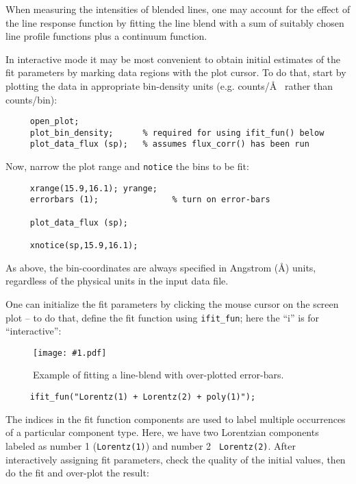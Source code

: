 \documentclass{book}
\newcommand{\putfig}[1]{\texttt{[image: \#1.pdf]}}
\newcommand{\putfig}[1]{\psfig{file=#1.ps}}
\begin{document}
{\begin{enumerate}
When measuring the intensities of blended lines, one may account for the
effect of the line response function by fitting the line blend with a sum of
suitably chosen line profile functions plus a continuum function.

In interactive mode it may be most convenient to obtain initial estimates of
the fit parameters by marking data regions with the plot cursor. To do that,
start by plotting the data in appropriate bin-density units (e.g. counts/\AA~
rather than counts/bin):

     \begin{verbatim}
     open_plot;
     plot_bin_density;      % required for using ifit_fun() below
     plot_data_flux (sp);   % assumes flux_corr() has been run
     \end{verbatim}

Now, narrow the plot range and {\tt notice} the
bins to be fit:

     \begin{verbatim}
     xrange(15.9,16.1); yrange;
     errorbars (1);               % turn on error-bars

     plot_data_flux (sp);

     xnotice(sp,15.9,16.1);
     \end{verbatim}

As above, the bin-coordinates are always specified in Angstrom (\AA)
units, regardless of the physical units in the input data file.

One can initialize the fit parameters by clicking the mouse cursor on the
screen plot -- to do that, define the fit function using {\tt ifit\_fun};
here the ``i'' is for ``interactive'':

\begin{figure}[ht]
\putfig{figures/profile_fit}
\caption{Example of fitting a line-blend with over-plotted error-bars.}
\label{fig:profile_fit}
\end{figure}

\begin{verbatim}
     ifit_fun("Lorentz(1) + Lorentz(2) + poly(1)");
     \end{verbatim}

The indices in the fit function components are used to label multiple
occurrences of a particular component type.  Here, we have two Lorentzian
components labeled as number 1 ({\tt Lorentz(1)}) and number 2 {\tt
Lorentz(2)}.  After interactively assigning fit parameters, check the
quality of the initial values, then do the fit and over-plot the result:


\end{enumerate}}
\end{document}
